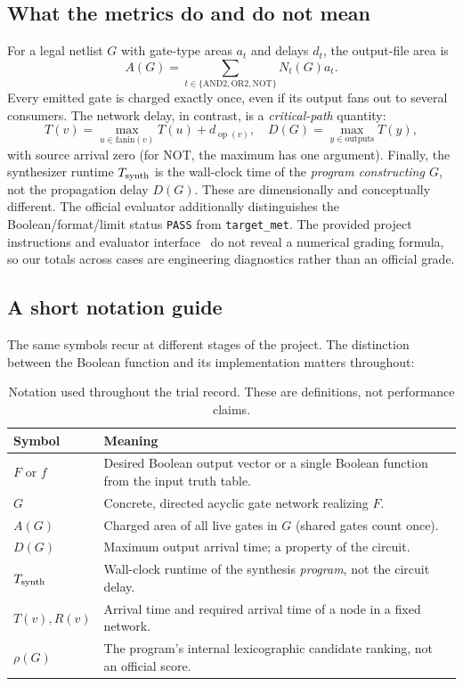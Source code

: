\subsection{What the metrics do and do not mean}
For a legal netlist $G$ with gate-type areas $a_t$ and delays $d_t$, the output-file area is
\begin{equation}\label{eq:logarea}
 A(G)=\sum_{t\in\{\mathrm{AND2},\mathrm{OR2},\mathrm{NOT}\}}N_t(G)a_t.
\end{equation}
Every emitted gate is charged exactly once, even if its output fans out to several consumers. The network delay, in contrast, is a \emph{critical-path} quantity:
\begin{equation}\label{eq:logdelay}
 T(v)=\max_{u\in\mathrm{fanin}(v)}T(u)+d_{\operatorname{op}(v)},\quad D(G)=\max_{y\in\mathrm{outputs}}T(y),
\end{equation}
with source arrival zero (for NOT, the maximum has one argument). Finally, the synthesizer runtime $T_{\rm synth}$ is the wall-clock time of the \emph{program constructing $G$}, not the propagation delay $D(G)$. These are dimensionally and conceptually different. The official evaluator additionally distinguishes the Boolean/format/limit status \texttt{PASS} from \texttt{target\_met}. The provided project instructions and evaluator interface~\cite{coursehandout} do not reveal a numerical grading formula, so our totals across cases are engineering diagnostics rather than an official grade.

\subsection{A short notation guide}
The same symbols recur at different stages of the project. The distinction between the Boolean function and its implementation matters throughout:
\begin{table}[H]
\centering\small
\caption{Notation used throughout the trial record. These are definitions, not performance claims.}\label{tab:notation}
\begin{tabularx}{\textwidth}{@{}p{}X@{}}\toprule
\textbf{Symbol} & \textbf{Meaning}\\\midrule
$F$ or $f$ & Desired Boolean output vector or a single Boolean function from the input truth table.\\
$G$ & Concrete, directed acyclic gate network realizing $F$.\\
$A(G)$ & Charged area of all live gates in $G$ (shared gates count once).\\
$D(G)$ & Maximum output arrival time; a property of the circuit.\\
$T_{\rm synth}$ & Wall-clock runtime of the synthesis \emph{program}, not the circuit delay.\\
$T(v),R(v)$ & Arrival time and required arrival time of a node in a fixed network.\\
$\rho(G)$ & The program's internal lexicographic candidate ranking, not an official score.\\
\bottomrule\end{tabularx}
\end{table}

